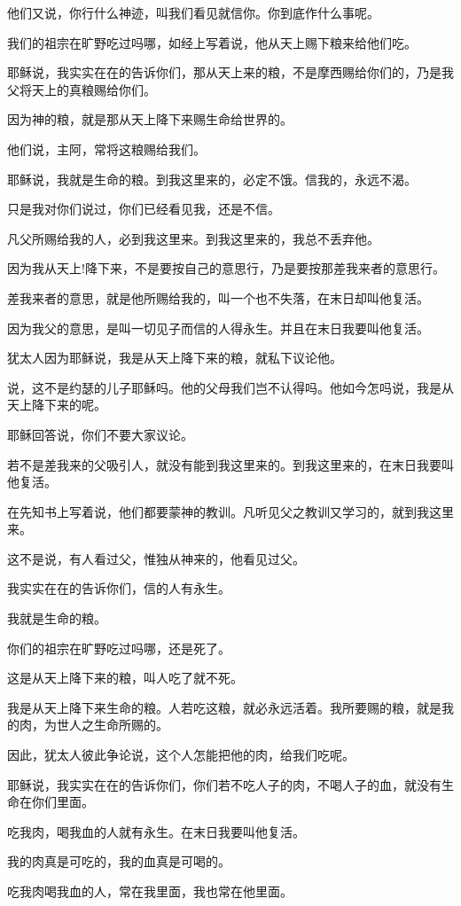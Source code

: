 \documentclass[12pt,oneside]{book}
\begin{document}
他们又说，你行什么神迹，叫我们看见就信你。你到底作什么事呢。

我们的祖宗在旷野吃过吗哪，如经上写着说，他从天上赐下粮来给他们吃。

耶稣说，我实实在在的告诉你们，那从天上来的粮，不是摩西赐给你们的，乃是我父将天上的真粮赐给你们。

因为神的粮，就是那从天上降下来赐生命给世界的。

他们说，主阿，常将这粮赐给我们。

耶稣说，我就是生命的粮。到我这里来的，必定不饿。信我的，永远不渴。

只是我对你们说过，你们已经看见我，还是不信。

凡父所赐给我的人，必到我这里来。到我这里来的，我总不丢弃他。

因为我从天上!降下来，不是要按自己的意思行，乃是要按那差我来者的意思行。

差我来者的意思，就是他所赐给我的，叫一个也不失落，在末日却叫他复活。

因为我父的意思，是叫一切见子而信的人得永生。并且在末日我要叫他复活。

犹太人因为耶稣说，我是从天上降下来的粮，就私下议论他。

说，这不是约瑟的儿子耶稣吗。他的父母我们岂不认得吗。他如今怎吗说，我是从天上降下来的呢。

耶稣回答说，你们不要大家议论。

若不是差我来的父吸引人，就没有能到我这里来的。到我这里来的，在末日我要叫他复活。

在先知书上写着说，他们都要蒙神的教训。凡听见父之教训又学习的，就到我这里来。

这不是说，有人看过父，惟独从神来的，他看见过父。

我实实在在的告诉你们，信的人有永生。

我就是生命的粮。

你们的祖宗在旷野吃过吗哪，还是死了。

这是从天上降下来的粮，叫人吃了就不死。

我是从天上降下来生命的粮。人若吃这粮，就必永远活着。我所要赐的粮，就是我的肉，为世人之生命所赐的。

因此，犹太人彼此争论说，这个人怎能把他的肉，给我们吃呢。

耶稣说，我实实在在的告诉你们，你们若不吃人子的肉，不喝人子的血，就没有生命在你们里面。

吃我肉，喝我血的人就有永生。在末日我要叫他复活。

我的肉真是可吃的，我的血真是可喝的。

吃我肉喝我血的人，常在我里面，我也常在他里面。
\end{document}
